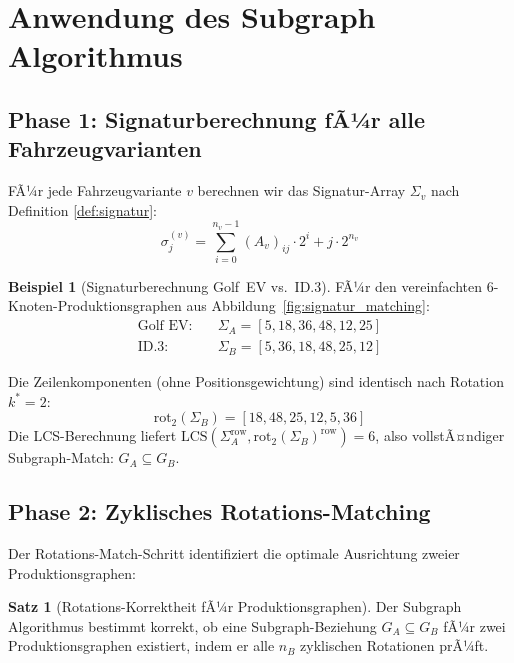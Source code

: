 ﻿\documentclass[a4paper,12pt]{article}
\theoremstyle{definition}
\newtheorem{beispiel}{Beispiel}
\newtheorem{satz}{Satz}
\begin{document}
\section{Anwendung des Subgraph Algorithmus}

\subsection{Phase 1: Signaturberechnung fÃ¼r alle Fahrzeugvarianten}

FÃ¼r jede Fahrzeugvariante $v$ berechnen wir das Signatur-Array $\Sigma_v$
nach Definition \ref{def:signatur}:
\[
\sigma_j^{(v)} = \sum_{i=0}^{n_v-1} (A_v)_{ij} \cdot 2^i + j \cdot 2^{n_v}
\]

\begin{beispiel}[Signaturberechnung Golf~EV vs.\ ID.3]
\label{bsp:signatur_golfvs_id3}
FÃ¼r den vereinfachten 6-Knoten-Produktionsgraphen aus Abbildung~\ref{fig:signatur_matching}:
\begin{align*}
\text{Golf EV}: \quad &\Sigma_A = [5, 18, 36, 48, 12, 25] \\
\text{ID.3}: \quad &\Sigma_B = [5, 36, 18, 48, 25, 12]
\end{align*}

Die Zeilenkomponenten (ohne Positionsgewichtung) sind identisch nach Rotation $k^* = 2$:
\[
\mathrm{rot}_2(\Sigma_B) = [18, 48, 25, 12, 5, 36]
\]
Die LCS-Berechnung liefert $\mathrm{LCS}(\Sigma_A^{\mathrm{row}}, \mathrm{rot}_2(\Sigma_B)^{\mathrm{row}}) = 6$,
also vollstÃ¤ndiger Subgraph-Match: $G_A \subseteq G_B$.
\end{beispiel}

\subsection{Phase 2: Zyklisches Rotations-Matching}

Der Rotations-Match-Schritt identifiziert die optimale Ausrichtung zweier Produktionsgraphen:

\begin{satz}[Rotations-Korrektheit fÃ¼r Produktionsgraphen]
\label{satz:rotations_korrektheit}
Der Subgraph Algorithmus bestimmt korrekt, ob eine Subgraph-Beziehung $G_A \subseteq G_B$
fÃ¼r zwei Produktionsgraphen existiert, indem er alle $n_B$ zyklischen Rotationen prÃ¼ft.
\end{satz}
\end{document}
